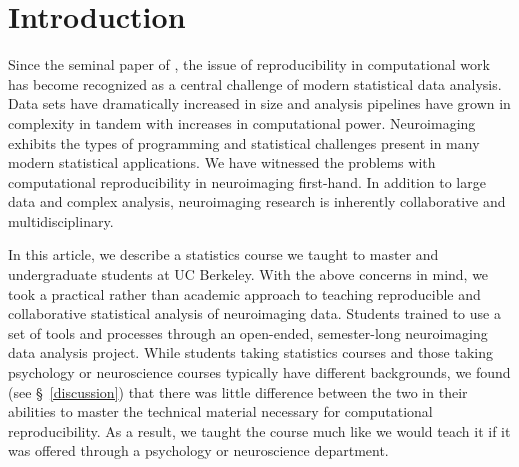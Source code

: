 \section{Introduction}

Since the seminal paper of \citet{buckheit1995wavelab}, the issue of
reproducibility in computational work has become recognized as a
central challenge of modern statistical data analysis.
Data sets have dramatically increased in size and
analysis pipelines have grown in complexity
in tandem with increases in computational power.
Neuroimaging exhibits the types of programming and statistical challenges
present in many modern statistical applications.
We have witnessed the problems with computational reproducibility in
neuroimaging first-hand.
In addition to large data and complex analysis,
neuroimaging research is inherently collaborative and
multidisciplinary.

In this article, we describe a statistics course we taught to master and
undergraduate students at UC Berkeley.
With the above concerns in mind, we took a practical rather than academic
approach to teaching reproducible and collaborative statistical analysis of
neuroimaging data.
Students trained to use a set of tools and processes through an open-ended,
semester-long neuroimaging data analysis project.
While students taking statistics courses and those taking psychology or
neuroscience courses typically have different backgrounds, we found (see
\S~\ref{discussion}) that there was little difference between the two in their
abilities to master the technical material necessary for computational
reproducibility.
As a result, we taught the course much like we would teach it if it was
offered through a psychology or neuroscience department.




